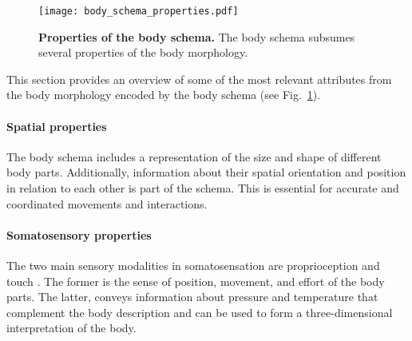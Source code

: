 
\begin{figure}
	\begin{center}
		\texttt{[image: body\_schema\_properties.pdf]}
		\caption{\textbf{Properties of the body schema.} The body schema subsumes several properties of the body morphology.}
		\label{fig:body_schema_properties}
	\end{center}
\end{figure}

This section provides an overview of some of the most relevant attributes from the body morphology encoded by the body schema (see Fig.~\ref{fig:body_schema_properties}).

\paragraph*{Spatial properties} The body schema includes a representation of the size and shape of different body parts. Additionally, information about their spatial orientation and position in relation to each other is part of the schema. This is essential for accurate and coordinated movements and interactions.

\paragraph*{Somatosensory properties} The two main sensory modalities in somatosensation are proprioception and touch \cite{Warren2018SomatosensorySystemI}. The former is the sense of position, movement, and effort of the body parts. %
The latter, conveys information about pressure and temperature that complement the body description and can be used to form a three-dimensional interpretation of the body.

